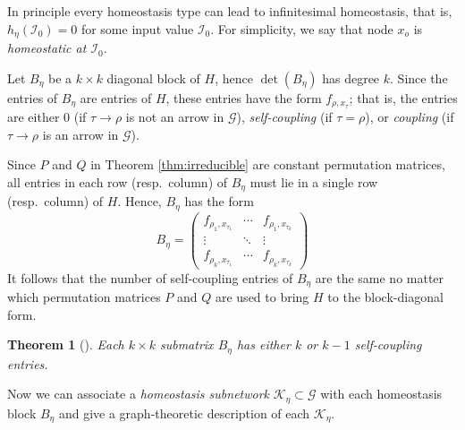 \documentclass[a4paper,fleqn]{cas-dc}
\newcommand{\II}{{\mathcal I}}
\newtheorem{theorem}{Theorem}[section]
\newcommand{\END}{\hfill\mbox{\raggedright \mbox{\raisebox{2pt}{\scalebox{0.6}{$\Diamond$}}}}\medskip}
\begin{document}

In principle every homeostasis type can lead to infinitesimal homeostasis, that is, $h_\eta(\II_0) = 0$ for some input 
value $\II_0$. 
For simplicity, we say that node $x_o$ is \emph{homeostatic at $\II_0$}.

Let $B_\eta$ be a $k\times k$ diagonal block of $H$, hence $\det(B_\eta)$ has degree $k$.  
Since the entries of $B_\eta$ are entries of $H$, these entries have the form $f_{\rho,x_\tau}$; that is, the entries are either $0$ (if $\tau\to\rho$ is not an arrow in $\mathcal{G}$), {\em self-coupling} (if $\tau = \rho$), or {\em coupling} (if $\tau\to\rho$ is an arrow in $\mathcal{G}$).  

Since $P$ and $Q$ in Theorem \ref{thm:irreducible} are constant permutation matrices, all entries in each row (resp.~column) of $B_\eta$ must lie in a single row (resp.~column) of $H$.  
Hence, $B_\eta$ has the form
\begin{equation} \label{eq:K}
B_\eta = \begin{pmatrix}
f_{\rho_1,x_{\tau_1}} & \cdots & f_{\rho_1,x_{\tau_k}} \\ 
	\vdots & \ddots & \vdots \\
	f_{\rho_k,x_{\tau_1}} & \cdots & f_{\rho_k,x_{\tau_k}}
\end{pmatrix}
\end{equation}
It follows that the number of self-coupling entries of $B_\eta$ are the same no matter which permutation matrices $P$ and $Q$ are used to bring $H$ to the block-diagonal form.

\begin{theorem}[{\cite[Theorem 4.4]{wang2021}}]
Each $k\times k$ submatrix $B_\eta$ has either $k$ or $k-1$ self-coupling entries.
\end{theorem}


Now we can associate a \emph{homeostasis subnetwork} $\mathcal{K}_\eta\subset\mathcal{G}$ with each homeostasis block $B_\eta$ and give a graph-theoretic description of each $\mathcal{K}_\eta$.
\end{document}
